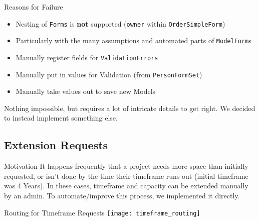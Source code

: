 \begin{frame}[c]{Reasons for Failure}
    \large
    \begin{itemize}[<+(1)->]
        \item Nesting of \texttt{Forms} is \textbf{not} supported (\texttt{owner} within \texttt{OrderSimpleForm})
        \item Particularly with the many assumptions and automated parts of \texttt{ModelForm}s
        \item Manually register fields for \texttt{ValidationErrors}
        \item Manually put in values for Validation (from \texttt{PersonFormSet})
        \item Manually take values out to save new Models
    \end{itemize}
    \pause
    Nothing impossible, but requires a lot of intricate details to get right.
    \pause
    We decided to instead implement something else.
\end{frame}


\subsection{Extension Requests}

\begin{frame}[c]{Motivation}
    It happens frequently that a project needs more space than initially
    requested, or isn't done by the time their timeframe runs out (initial
    timeframe was 4 Years). In these cases, timeframe and capacity can be
    extended manually by an admin. To automate/improve this process, we
    implemented it directly.
\end{frame}



\begin{frame}[c]{Routing for Timeframe Requests}
    \large
    \texttt{[image: timeframe\_routing]}
\end{frame}

